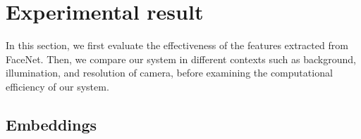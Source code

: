 \documentclass[journal, twocolumn]{IEEEtran}
\begin{document}
\medskip
\section{Experimental result}
\label{experimental-result}

In this section, we first evaluate the effectiveness of the features extracted from FaceNet. Then, we compare our system in different contexts such as background, illumination, and resolution of camera, before examining the computational efficiency of our system.


\subsection{Embeddings} 
\end{document}
